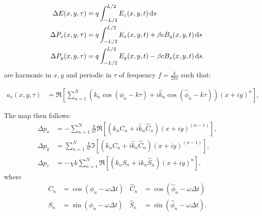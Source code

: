 \begin{align}
\Delta E(x,y,\tau) &= q \int_{-L/2}^{L/2} E_z(x,y,t)  {\rm \,d}s \\
\Delta P_x(x,y,\tau) &= q \int_{-L/2}^{L/2} E_x(x,y,t) + \beta c B_y(x,y,t) {\rm \,d}s\\
\Delta P_y(x,y,\tau) &= q \int_{-L/2}^{L/2} E_y(x,y,t) - \beta c B_x(x,y,t) {\rm \,d}s.
\end{align}
are harmonic in $x,y$ and periodic in $\tau$ of frequency $f=\frac{k}{2\pi c}$ such that:

\begin{align}
a_s(x,y,\tau) 
&= \Re \left[ \sum_{n=1}^N
      \left(       k_n \cos(\phi_n -k \tau ) +
            i \hat k_n \cos(\hat \phi_n -k \tau)
      \right)    
      (x+i y )^n
     \right],
\end{align}

The map then follows:
\begin{align}
    \Delta p_x &= -\sum_{n=1}^N \frac{\chi}{n!} \Re\left[ (k_n C_n + i \hat k_n \hat C_n)(x+iy)^{(n-1)}\right], \\
    \Delta p_y &=  \sum_{n=1}^N \frac{\chi}{n!} \Im\left[ (k_n C_n + i \hat k_n \hat C_n)(x+iy)^{(n-1)}\right], \\
    \Delta p_\tau &= -\chi k \sum_{n=1}^N \Re\left[( k_n S_n + i k_n \hat S_n ) (x+iy)^n\right],
\end{align}
where
\begin{align}
     C_n&=\cos(\phi_n-\omega \Delta t) &
\hat C_n&=\cos(\hat \phi_n-\omega \Delta t) \\
     S_n&=\sin(\phi_n-\omega \Delta t) &
\hat S_n&=\sin(\hat \phi_n-\omega \Delta t) .
\end{align}


